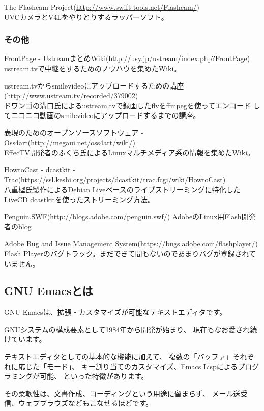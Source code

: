 \documentclass[mingoth,a4paper]{jsarticle}
\begin{document}
The Flashcam Project(\url{http://www.swift-tools.net/Flashcam/})\\
UVCカメラとV4Lをやりとりするラッパーソフト。

\subsubsection{その他}

FrontPage - UstreamまとめWiki(\url{http://usy.jp/ustream/index.php?FrontPage})\\
ustream.tvで中継をするためのノウハウを集めたWiki。

ustream.tvからsmilevideoにアップロードするための講座(\url{http://www.ustream.tv/recorded/379002})\\
ドワンゴの溝口氏によるustream.tvで録画したflvをffmpegを使ってエンコード
してニコニコ動画のsmilevideoにアップロードするまでの講座。

表現のためのオープンソースソフトウェア - Oss4art(\url{http://megaui.net/oss4art/wiki/})\\
EffecTV開発者のふくち氏によるLinuxマルチメディア系の情報を集めたWiki。

HowtoCast - dcastkit - Trac(\url{https://ssl.keshi.org/projects/dcastkit/trac.fcgi/wiki/HowtoCast})\\
八重樫氏製作によるDebian Liveベースのライブストリーミングに特化した
LiveCD dcastkitを使ったストリーミング方法。

Penguin.SWF(\url{http://blogs.adobe.com/penguin.swf/})
AdobeのLinux用Flash開発者のblog

Adobe Bug and Issue Management System(\url{https://bugs.adobe.com/flashplayer/})
Flash Playerのバグトラック。まだできて間もないのであまりバグが登録されていません。

\subsection{GNU Emacsとは}
GNU Emacsは、拡張・カスタマイズが可能なテキストエディタです。

GNUシステムの構成要素として1984年から開発が始まり、
現在もなお愛され続けています。

テキストエディタとしての基本的な機能に加えて、
複数の「バッファ」それぞれに応じた「モード」、
キー割り当てのカスタマイズ、Emacs Lispによるプログラミングが可能、
といった特徴があります。

その柔軟性は、文書作成、コーディングという用途に留まらず、
メール送受信、ウェブブラウズなどもこなせるほどです。
\end{document}
